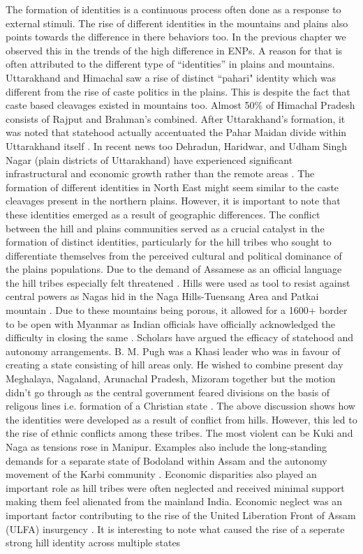 The formation of identities is a continuous process often done as a response to external stimuli. The rise of different identities in the mountains and plains also points towards the difference in there behaviors too. In the previous chapter we observed this in the trends of the high difference in ENPs. A reason for that is often attributed to the different type of ``identities'' in plains and mountains. Uttarakhand and Himachal saw a rise of distinct ``pahari" identity \citep{mishra2000politics} which was different from the rise of caste politics in the plains. This is despite the fact that caste based cleavages existed in mountains too. Almost 50\% of Himachal Pradesh consists of Rajput and Brahman's combined. After Uttarakhand's formation, it was noted that statehood actually accentuated the Pahar Maidan divide within Uttarakhand itself \citep{mathur2015remote}. In recent news too Dehradun, Haridwar, and Udham Singh Nagar (plain districts of Uttarakhand) have experienced significant infrastructural and economic growth rather than the remote areas \citep{Mohammad_TOI}. The formation of different identities in North East might seem similar to the caste cleavages present in the northern plains. However, it is important to note that these identities emerged as a result of geographic differences. The conflict between the hill and plains communities served as a crucial catalyst in the formation of distinct identities, particularly for the hill tribes who sought to differentiate themselves from the perceived cultural and political dominance of the plains populations. Due to the demand of Assamese as an official language the hill tribes especially felt threatened \citep{inoue2005integration}. Hills were used as tool to resist against central powers as Nagas hid in the Naga Hills-Tuensang Area and Patkai mountain \citep{kapai2020spatial}. Due to these mountains being porous, it allowed for a 1600+ border to be open with Myanmar as Indian officials have officially acknowledged the difficulty in closing the same \citep{Bureau_2024}. Scholars have argued the efficacy of statehood and autonomy arrangements.  B. M. Pugh was a Khasi leader who was in favour of creating a state consisting of hill areas only. He wished to combine present day Meghalaya, Nagaland, Arunachal Pradesh, Mizoram together but the motion didn't go through as the central government feared divisions on the basis of religous lines i.e. formation of a Christian state \citep{karlsson2013evading}. The above discussion shows how the identities were developed as a result of conflict from hills. However, this led to the rise of ethnic conflicts among these tribes. The most violent can be Kuki and Naga as tensions rose in Manipur.  Examples also include the long-standing demands for a separate state of Bodoland within Assam  and the autonomy movement of the Karbi community \citep{sarma2017bodoland}. Economic disparities also played an important role as hill tribes were often neglected and received minimal support making them feel alienated from the mainland India. Economic neglect was an important factor contributing to the rise of the United Liberation Front of Assam (ULFA) insurgency \citep{chima2023insurgency}. It is interesting to note what caused the rise of a seperate strong hill identity across multiple states 